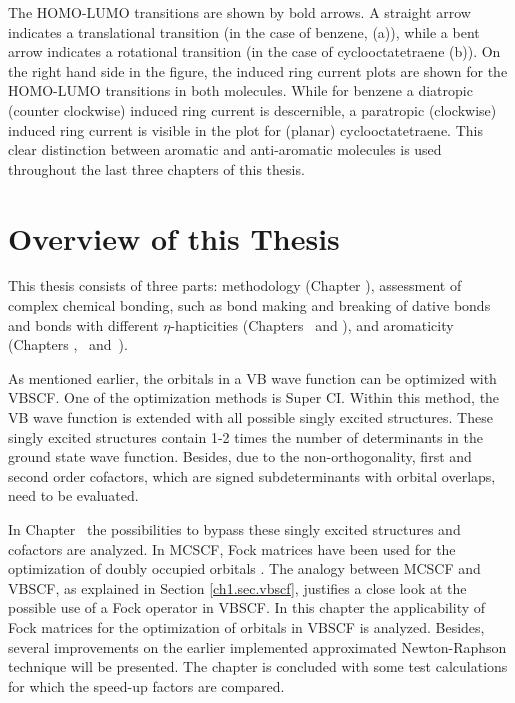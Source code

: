 The HOMO-LUMO transitions are shown by bold arrows. A straight arrow indicates a translational transition (in the case of benzene, (a)), while a bent arrow indicates a rotational transition (in the case of cyclooctatetraene (b)). On the right hand side in the figure, the induced ring current plots are shown for the HOMO-LUMO transitions in both molecules. While for benzene a diatropic (counter clockwise) induced ring current is descernible, a paratropic (clockwise) induced ring current is visible in the plot for (planar) cyclooctatetraene. This clear distinction between aromatic and anti-aromatic molecules is used throughout the last three chapters of this thesis.

\section{Overview of this Thesis}

This thesis consists of three parts: methodology (Chapter \chorbopt), assessment of complex chemical bonding, such as bond making and breaking of dative bonds and bonds with different $\eta$-hapticities (Chapters \chdissociation\ and \chcyclopentadienyl), and aromaticity (Chapters \chhuckel, \chinorganic\ and~\chindacene).

As mentioned earlier, the orbitals in a VB wave function can be optimized with \mbox{VBSCF}. One of the optimization methods is Super CI. Within this method, the VB wave function is extended with all possible singly excited structures. These singly excited structures contain 1-2 times the number of determinants in the ground state wave function. Besides, due to the non-orthogonality, first and second order cofactors, which are signed subdeterminants with orbital overlaps, need to be evaluated.

In Chapter \chorbopt\ the possibilities to bypass these singly excited structures and cofactors are analyzed. In MCSCF, Fock matrices have been used for the optimization of doubly occupied orbitals \cite{roos1,roos2}. The analogy between MCSCF and VBSCF, as explained in Section \ref{ch1.sec.vbscf}, justifies a close look at the possible use of a Fock operator in VBSCF. In this chapter the applicability of Fock matrices for the optimization of orbitals in VBSCF is analyzed. Besides, several improvements on the earlier implemented approximated Newton-Raphson technique \cite{koos1} will be presented. The chapter is concluded with some test calculations for which the speed-up factors are compared.

